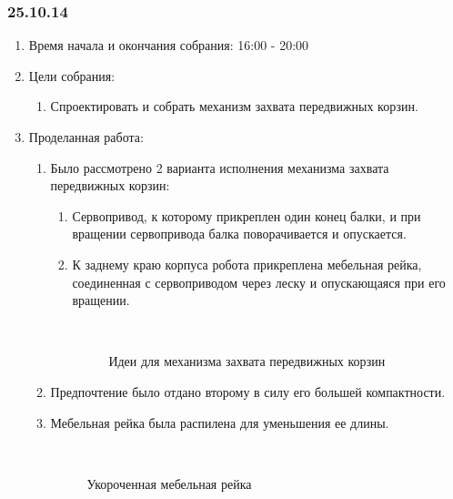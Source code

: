
\subsubsection{25.10.14}

\begin{enumerate}
	\item Время начала и окончания собрания:
	16:00 - 20:00
	\item Цели собрания:
	\begin{enumerate}
	  \item Спроектировать и собрать механизм захвата передвижных корзин.
	  
    \end{enumerate}
    
	\item Проделанная работа:
	\begin{enumerate}
	  \item Было рассмотрено 2 варианта исполнения механизма захвата передвижных корзин:
	  \begin{enumerate}
	    \item Сервопривод, к которому прикреплен один конец балки, и при вращении сервопривода балка поворачивается и опускается.
	    
	    \item К заднему краю корпуса робота прикреплена мебельная рейка, соединенная с сервоприводом через леску и опускающаяся при его вращении.
	    
	    \begin{figure}[H]
	    	\begin{minipage}[h]{0.2\linewidth}
	    		\center   
	    	\end{minipage}
	    	\begin{minipage}[h]{0.6\linewidth}
	    		\caption{Идеи для механизма захвата передвижных корзин}
	    	\end{minipage}
	    \end{figure}
	    
      \end{enumerate}
      \item Предпочтение было отдано второму в силу его большей компактности.
      
      \item Мебельная рейка была распилена для уменьшения ее длины.
      
      \begin{figure}[H]
      	\begin{minipage}[h]{0.2\linewidth}
      		\center   
      	\end{minipage}
      	\begin{minipage}[h]{0.6\linewidth}
      		\caption{Укороченная мебельная рейка}
      	\end{minipage}
      \end{figure}
      

\end{enumerate}
\end{enumerate}
